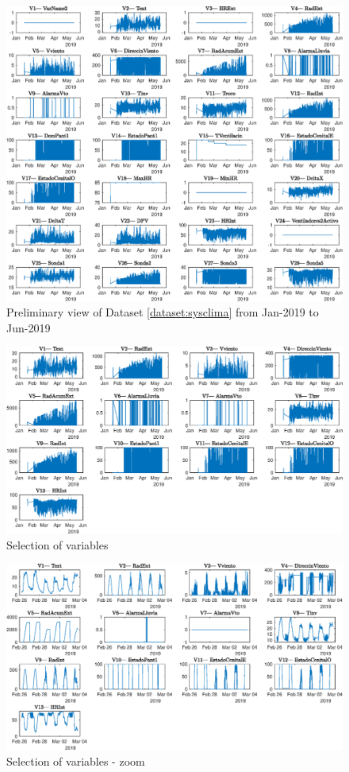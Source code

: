 \begin{figure}[ht!]
    \centering
    \includegraphics[scale=0.65]{img/fulldata.eps}
    \caption{Preliminary view of Dataset \ref{dataset:sysclima} from Jan-2019 to Jun-2019 }
    \label{fig:ViewDataSetSysClima}
\end{figure}

\begin{figure}
    \centering
    \includegraphics[scale=0.55]{img/fulldata_remove_no_data.eps}
    \caption{Selection of variables}
\end{figure}
\begin{figure}
    \centering
    \includegraphics[scale=0.55]{img/fulldata_remove_no_data_zoom.eps}
    \caption{Selection of variables - zoom }
\end{figure}


